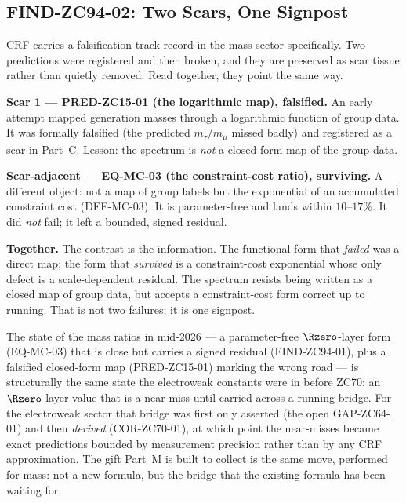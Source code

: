 \documentclass[12pt, a4paper]{article}
\begin{document}
\subsection{FIND-ZC94-02: Two Scars, One Signpost}
\label{sec:scars-zc94}

CRF carries a falsification track record in the mass sector specifically. Two
predictions were registered and then broken, and they are preserved as scar
tissue rather than quietly removed. Read together, they point the same way.

\begin{genealogybox}[title={The two mass-sector scars}]
\textbf{Scar 1 --- PRED-ZC15-01 (the logarithmic map), falsified.} An early
attempt mapped generation masses through a logarithmic function of group data.
It was formally falsified (the predicted $m_\tau/m_\mu$ missed badly) and
registered as a scar in Part~C. Lesson: the spectrum is \emph{not} a closed-form
map of the group data.

\smallskip
\textbf{Scar-adjacent --- EQ-MC-03 (the constraint-cost ratio), surviving.}
A different object: not a map of group labels but the exponential of an
accumulated constraint cost (DEF-MC-03). It is parameter-free and lands within
$10$--$17\%$. It did \emph{not} fail; it left a bounded, signed residual.

\smallskip
\textbf{Together.} The contrast is the information. The functional form that
\emph{failed} was a direct map; the form that \emph{survived} is a
constraint-cost exponential whose only defect is a scale-dependent residual.
The spectrum resists being written as a closed map of group data, but accepts a
constraint-cost form correct up to running. That is not two failures; it is one
signpost.
\end{genealogybox}

\begin{giftbox}[title={FIND-ZC94-02: The Mass Sector Is Where the Electroweak
  Sector Was Before ZC70}]
The state of the mass ratios in mid-2026 --- a parameter-free $\Rzero$-layer
form (EQ-MC-03) that is close but carries a signed residual (FIND-ZC94-01),
plus a falsified closed-form map (PRED-ZC15-01) marking the wrong road --- is
structurally the same state the electroweak constants were in before ZC70: an
$\Rzero$-layer value that is a near-miss until carried across a running bridge.
For the electroweak sector that bridge was first only asserted (the open
GAP-ZC64-01) and then \emph{derived} (COR-ZC70-01), at which point the
near-misses became exact predictions bounded by measurement precision rather
than by any CRF approximation. The gift Part~M is built to collect is the same
move, performed for mass: not a new formula, but the bridge that the existing
formula has been waiting for.
\end{giftbox}
\end{document}
